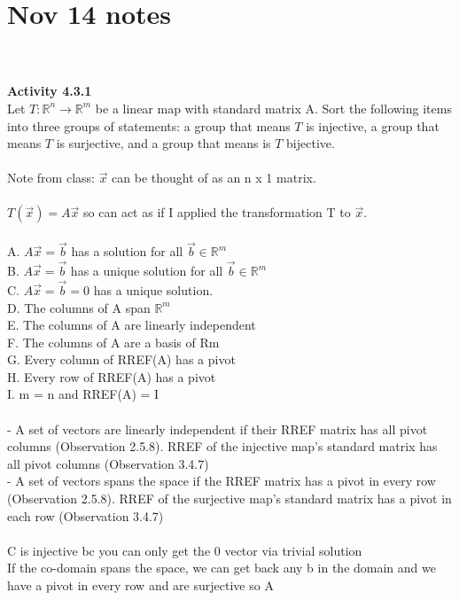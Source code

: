 \documentclass{article}
\begin{document}
\section*{Nov 14 notes}\\
\\
\noindent\textbf{Activity 4.3.1}\\
Let $T: \mathbb{R}^n \to \mathbb{R}^m$ be a linear map with standard matrix A. Sort the following items into three groups of statements: a group that means $T$ is injective, a group that means $T$ is surjective, and a group that means is $T$ bijective.\\
\\
Note from class: $\vec x$ can be thought of as an n x 1 matrix.\\
\\
$T(\vec{x}) = A\vec{x}$ so can act as if I applied the transformation T to $\vec{x}$.\\
\\
A. $A\vec x=\vec b$ has a solution for all $\vec b\in\mathbb{R}^m$\\
B. $A\vec x=\vec b$ has a unique solution for all $\vec b\in\mathbb{R}^m$\\
C. $A\vec x=\vec b = 0$ has a unique solution.\\
D. The columns of A span $\mathbb{R}^m$\\
E. The columns of A are linearly independent\\
F. The columns of A are a basis of Rm\\
G. Every column of RREF(A) has a pivot\\
H. Every row of RREF(A) has a pivot\\
I. m = n and RREF(A) = I\\
\\
- A set of vectors are linearly independent if their RREF matrix has all pivot columns (Observation 2.5.8). RREF of the injective map’s standard matrix has all pivot columns (Observation 3.4.7)\\
- A set of vectors spans the space if the RREF matrix has a pivot in every row (Observation 2.5.8). RREF of the surjective map’s standard matrix has a pivot in each row (Observation 3.4.7)\\
\\
C is injective bc you can only get the 0 vector via trivial solution\\
If the co-domain spans the space, we can get back any b in the domain and we have a pivot in every row and are surjective so A\\
\end{document}
